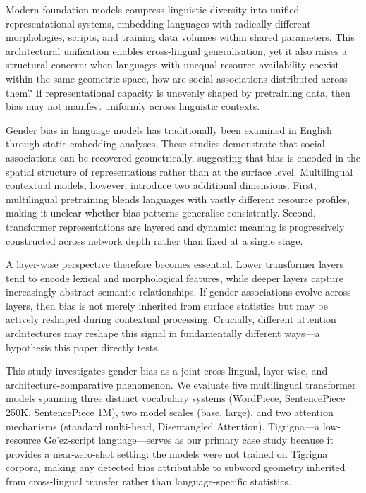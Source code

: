 \documentclass[10pt]{article}
\begin{document}
Modern foundation models compress linguistic diversity into unified
representational systems, embedding languages with radically different
morphologies, scripts, and training data volumes within shared parameters.
This architectural unification enables cross-lingual generalisation, yet it
also raises a structural concern: when languages with unequal resource
availability coexist within the same geometric space, how are social
associations distributed across them? If representational capacity is
unevenly shaped by pretraining data, then bias may not manifest uniformly
across linguistic contexts.

Gender bias in language models has traditionally been examined in English
through static embedding analyses. These studies demonstrate that social
associations can be recovered geometrically, suggesting that bias is encoded
in the spatial structure of representations rather than at the surface level.
Multilingual contextual models, however, introduce two additional dimensions.
First, multilingual pretraining blends languages with vastly different resource
profiles, making it unclear whether bias patterns generalise consistently.
Second, transformer representations are layered and dynamic: meaning is
progressively constructed across network depth rather than fixed at a single
stage.

A layer-wise perspective therefore becomes essential. Lower transformer layers
tend to encode lexical and morphological features, while deeper layers capture
increasingly abstract semantic relationships. If gender associations evolve across layers, then bias
is not merely inherited from surface statistics but may be actively reshaped
during contextual processing. Crucially, different attention architectures may
reshape this signal in fundamentally different ways---a hypothesis this paper
directly tests.

This study investigates gender bias as a joint cross-lingual, layer-wise, and
architecture-comparative phenomenon. We evaluate five multilingual transformer
models spanning three distinct vocabulary systems (WordPiece, SentencePiece
250K, SentencePiece 1M), two model scales (base, large), and two attention
mechanisms (standard multi-head, Disentangled Attention). Tigrigna---a
low-resource Ge'ez-script language---serves as our primary case study because
it provides a near-zero-shot setting: the models were not trained on Tigrigna
corpora, making any detected bias attributable to subword geometry inherited
from cross-lingual transfer rather than language-specific statistics.
\end{document}
